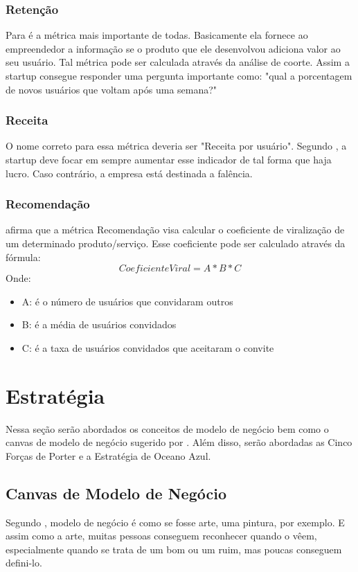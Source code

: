 \subsubsection{Retenção}
\label{cha:retencao}
Para  é a métrica mais importante de todas. Basicamente ela fornece ao empreendedor a informação se o produto que ele desenvolvou adiciona valor ao seu usuário. Tal métrica pode ser calculada através da análise de coorte. Assim a startup consegue responder uma pergunta importante como: "qual a porcentagem de novos usuários que voltam após uma semana?"

\subsubsection{Receita}
\label{cha:receita}
O nome correto para essa métrica deveria ser "Receita por usuário". Segundo , a startup deve focar em sempre aumentar esse indicador de tal forma que haja lucro. Caso contrário, a empresa está destinada a falência.

\subsubsection{Recomendação}
\label{cha:recomendacao}
 afirma que a métrica Recomendação visa calcular o coeficiente de viralização de um determinado produto/serviço. Esse coeficiente pode ser calculado através da fórmula: 
\begin{equation}
CoeficienteViral = A * B * C
\end{equation}
Onde:
\begin{itemize}
\item A: é o número de usuários que convidaram outros
\item B: é a média de usuários convidados
\item C: é a taxa de usuários convidados que aceitaram o convite
\end{itemize}

\section{Estratégia}
\label{cha:estrategia}
Nessa seção serão abordados os conceitos de modelo de negócio bem como o canvas de modelo de negócio sugerido por . Além disso, serão abordadas as Cinco Forças de Porter e a Estratégia de Oceano Azul.

\subsection{Canvas de Modelo de Negócio}
\label{cha:canvas_de_modelo_de_negocio}
Segundo , modelo de negócio é como se fosse arte, uma pintura, por exemplo. E assim como a arte, muitas pessoas conseguem reconhecer quando o vêem, especialmente quando se trata de um bom ou um ruim, mas poucas conseguem defini-lo.


